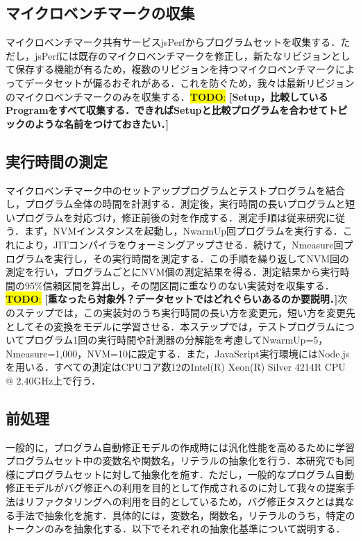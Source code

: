 \documentclass[T,J]{fose} %
\newcommand{\todo}[1]{\colorbox{yellow}{{\bf TODO}:}{\color{red} {\textbf{[#1]}}}}
\begin{document}
\subsection{マイクロベンチマークの収集}
マイクロベンチマーク共有サービスjsPerfからプログラムセットを収集する．ただし，jsPerfには既存のマイクロベンチマークを修正し，新たなリビジョンとして保存する機能が有るため，複数のリビジョンを持つマイクロベンチマークによってデータセットが偏るおそれがある．これを防ぐため，我々は最新リビジョンのマイクロベンチマークのみを収集する．\todo{Setup，比較しているProgramをすべて収集する．できればSetupと比較プログラムを合わせてトピックのような名前をつけておきたい．}

\subsection{実行時間の測定}
マイクロベンチマーク中のセットアッププログラムとテストプログラムを結合し，プログラム全体の時間を計測する．測定後，実行時間の長いプログラムと短いプログラムを対応づけ，修正前後の対を作成する．測定手順は従来研究に従う．まず，NVMインスタンスを起動し，NwarmUp回プログラムを実行する．これにより，JITコンパイラをウォーミングアップさせる．続けて，Nmeasure回プログラムを実行し，その実行時間を測定する．この手順を繰り返してNVM回の測定を行い，プログラムごとにNVM個の測定結果を得る．測定結果から実行時間の95\%信頼区間を算出し，その閉区間に重なりのない実装対を収集する．\todo{重なったら対象外？データセットではどれぐらいあるのか要説明．}次のステップでは，この実装対のうち実行時間の長い方を変更元，短い方を変更先としてその変換をモデルに学習させる．本ステップでは，テストプログラムについてプログラム1回の実行時間や計測器の分解能を考慮してNwarmUp=5，Nmeasure=1,000，NVM=10に設定する．また，JavaScript実行環境にはNode.jsを用いる．すべての測定はCPUコア数12のIntel(R) Xeon(R) Silver 4214R CPU @ 2.40GHz上で行う．


\subsection{前処理}
一般的に，プログラム自動修正モデルの作成時には汎化性能を高めるために学習プログラムセット中の変数名や関数名，リテラルの抽象化を行う．本研究でも同様にプログラムセットに対して抽象化を施す．ただし，一般的なプログラム自動修正モデルがバグ修正への利用を目的として作成されるのに対して我々の提案手法はリファクタリングへの利用を目的としているため，バグ修正タスクとは異なる手法で抽象化を施す．具体的には，変数名，関数名，リテラルのうち，特定のトークンのみを抽象化する．以下でそれぞれの抽象化基準について説明する．
\end{document}
